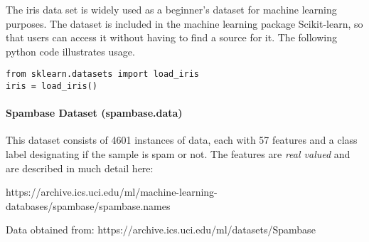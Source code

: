\documentclass[12pt]{article}
\begin{document}
\noindent
The iris data set is widely used as a beginner's dataset for machine learning purposes. The dataset is included in the machine learning package Scikit-learn, so that users can access it without having to find a source for it. The following python code illustrates usage.

\begin{lstlisting}
from sklearn.datasets import load_iris
iris = load_iris()
\end{lstlisting}


\paragraph{Spambase Dataset  (spambase.data)}
This dataset consists of 4601 instances of data, each with 57 features and a class label designating if the sample is spam or not.
The features are \emph{real valued} and are described in much detail here:
\begin{center}
  https://archive.ics.uci.edu/ml/machine-learning-databases/spambase/spambase.names\\
\end{center}

\noindent
Data obtained from:  https://archive.ics.uci.edu/ml/datasets/Spambase


\newpage
\end{document}
